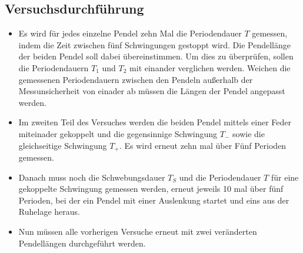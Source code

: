 \subsection{Versuchsdurchführung}
\begin{itemize}
    \item Es wird für jedes einzelne Pendel zehn Mal die Periodendauer $T$ gemessen, indem die Zeit zwischen fünf Schwingungen gestoppt wird. Die Pendellänge der beiden Pendel soll dabei übereinstimmen. Um dies zu überprüfen, sollen die Periodendauern
        $T_1$ und $T_2$ mit einander verglichen werden. Weichen die gemessenen Periodendauern zwischen den Pendeln außerhalb der Messunsicherheit von einader ab müssen die Längen der Pendel angepasst werden.
    \item Im zweiten Teil des Versuches werden die beiden Pendel mittels einer Feder miteinader gekoppelt und die gegensinnige Schwingung $T_-$ sowie die gleichseitige Schwingung $T_+$. Es wird erneut zehn mal über Fünf Perioden gemessen.
    \item Danach muss noch die Schwebungsdauer $T_S$ und die Periodendauer $T$ für eine gekoppelte Schwingung gemessen werden, erneut jeweils 10 mal über fünf Perioden, bei der ein Pendel mit einer Auslenkung startet und eins aus der Ruhelage heraus.
    \item Nun müssen alle vorherigen Versuche erneut mit zwei veränderten Pendellängen durchgeführt werden.
\end{itemize}